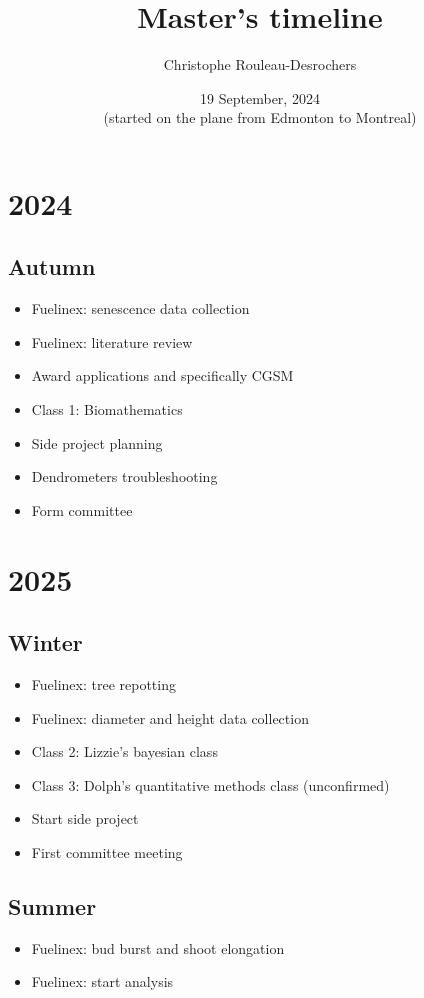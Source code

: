\documentclass{article}
\title{Master's timeline}
\author[]{Christophe Rouleau-Desrochers}
\date{19 September, 2024 \\ (started on the plane from Edmonton to Montreal)}
\begin{document}
\maketitle

\section{2024}
\subsection {Autumn}
\begin {itemize}
	\item Fuelinex: senescence data collection
	\item Fuelinex: literature review
	\item Award applications and specifically CGSM
	\item Class 1: Biomathematics
	\item Side project planning
	\item Dendrometers troubleshooting
	\item Form committee
\end {itemize}

\section {2025}
\subsection {Winter}
\begin {itemize}
	\item Fuelinex: tree repotting
	\item Fuelinex: diameter and height data collection
	\item Class 2: Lizzie's bayesian class
	\item Class 3: Dolph's quantitative methods class (unconfirmed)
	\item Start side project
	\item First committee meeting
\end {itemize}

\subsection {Summer}
\begin {itemize}
	\item Fuelinex: bud burst and shoot elongation
	\item Fuelinex: start analysis
\end {itemize}
\end{document}

